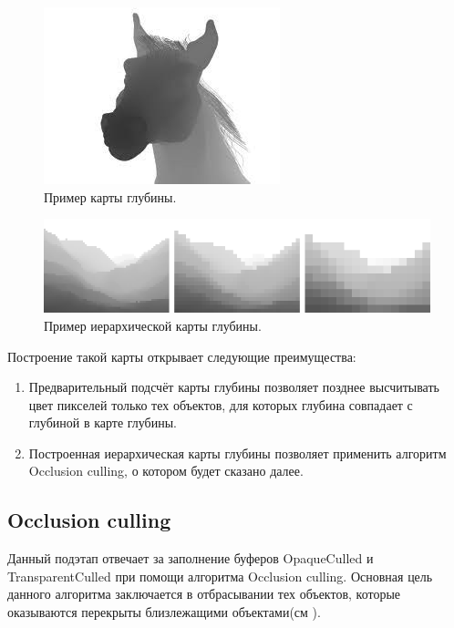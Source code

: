 		\begin{figure}[ht!] 
			\center
			\includegraphics [scale=1] {my_folder/images//depth_map}	
			\caption{Пример карты глубины.} 
			\label{fig:depth_map}
		\end{figure}
		
		\begin{figure}[ht!] 
			\center
			\includegraphics [scale=1] {my_folder/images//hier_depth_map}	
			\caption{Пример иерархической карты глубины.} 
			\label{fig:hier_depth_map}
		\end{figure}
		\FloatBarrier
		Построение такой карты открывает следующие преимущества:
		\begin{enumerate}[1.]
			\item Предварительный подсчёт карты глубины позволяет позднее высчитывать цвет пикселей только тех объектов, для которых глубина совпадает с глубиной в карте глубины.
			\item Построенная иерархическая карты глубины позволяет применить алгоритм Occlusion culling, о котором будет сказано далее.
		\end{enumerate}
	\subsection{Occlusion culling} \label{ch3:pre_pass:occlusion}
		Данный подэтап отвечает за заполнение буферов OpaqueCulled и  TransparentCulled при помощи алгоритма Occlusion culling. Основная цель данного алгоритма заключается в отбрасывании тех объектов, которые оказываются перекрыты близлежащими объектами(см ). 
		
